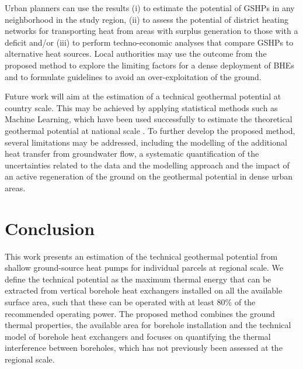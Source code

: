 Urban planners can use the results (i) to estimate the potential of GSHPs in any neighborhood in the study region, (ii) to assess the potential of district heating networks for transporting heat from areas with surplus generation to those with a deficit and/or (iii) to perform techno-economic analyses that compare GSHPs to alternative heat sources.
Local authorities may use the outcome from the proposed method to explore the limiting factors for a dense deployment of BHEs and to formulate guidelines to avoid an over-exploitation of the ground.

Future work will aim at the estimation of a technical geothermal potential at country scale.
This may be achieved by applying statistical methods such as Machine Learning, which have been used successfully to estimate the theoretical geothermal potential at national scale \cite{assouline_machine_2019}.
To further develop the proposed method, several limitations may be addressed, including the modelling of the additional heat transfer from groundwater flow, a systematic quantification of the uncertainties related to the data and the modelling approach and the impact of an active regeneration of the ground on the geothermal potential in dense urban areas.


\section{Conclusion}
\label{conclusion_BHE}

This work presents an estimation of the technical geothermal potential from shallow ground-source heat pumps for individual parcels at regional scale.
We define the technical potential as the maximum thermal energy that can be extracted from vertical borehole heat exchangers installed on all the available surface area, such that these can be operated with at least $80\%$ of the recommended operating power. 
The proposed method combines the ground thermal properties, the available area for borehole installation and the technical model of borehole heat exchangers and focuses on quantifying the thermal interference between boreholes, which has not previously been assessed at the regional scale.

